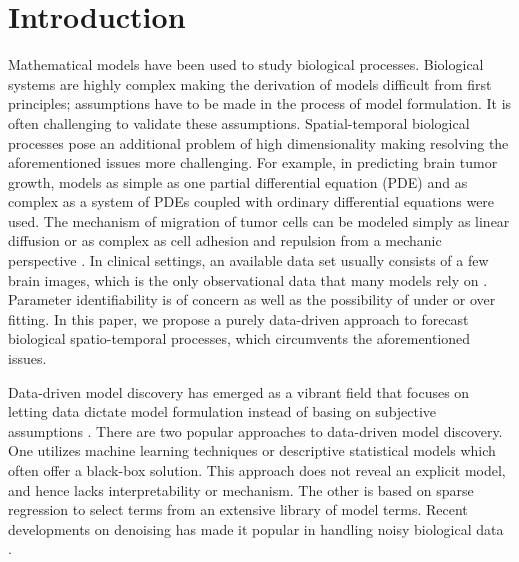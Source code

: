 \documentclass[smallextended,natbib]{svjour3}       %
\begin{document}
\section{Introduction}
\label{intro}
Mathematical models have been used to study biological processes. Biological systems are highly complex making the derivation of models difficult from first principles; assumptions have to be made in the process of model formulation.  It is often challenging to validate these assumptions. Spatial-temporal biological processes pose an additional problem of high dimensionality making resolving the aforementioned issues more challenging. For example, in predicting brain tumor growth, models as simple as one partial differential equation (PDE) \citep{Jackson2015a} and as complex as a system of PDEs coupled with ordinary differential equations \citep{Eikenberry2009} were used. The mechanism of migration of tumor cells can be modeled simply as linear diffusion  or as complex as cell adhesion and repulsion from a mechanic perspective \citep{khain2012migration,aubert2008model}. In clinical settings, an available data set usually consists of a few brain images, which is the only observational data that many models rely on \citep{lipkova2019personalized,Kostelich2011a,Jackson2015a}. Parameter identifiability is of concern as well as the possibility of under or over fitting. In this paper, we propose a purely data-driven approach to forecast biological spatio-temporal processes, which circumvents the aforementioned issues.              

Data-driven model discovery has emerged as a vibrant field that focuses on letting data dictate model formulation instead of basing on subjective assumptions \citep{Brunton2019}. There are two popular approaches to data-driven model discovery. One utilizes machine learning techniques or descriptive statistical models which often offer a black-box solution. This approach does not reveal an explicit model, and hence lacks interpretability or mechanism. The other is based on sparse regression to select terms from an extensive library of model terms. Recent developments on denoising has made it popular in handling noisy biological data \citep{Nardini2020,Lagergren2020a}.
\end{document}
